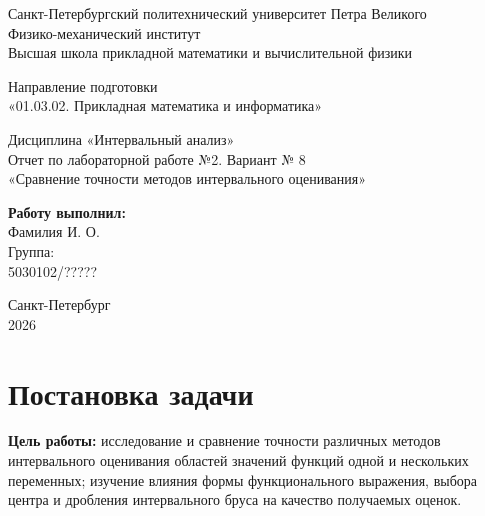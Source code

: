 \documentclass[12pt,a4paper]{article}
\begin{document}
\begin{titlepage}
\begin{center}
Санкт-Петербургский политехнический университет Петра Великого\\
Физико-механический институт\\
Высшая школа прикладной математики и вычислительной физики

\vspace{4cm}

Направление подготовки\\
«01.03.02. Прикладная математика и информатика»

\vspace{3cm}

{\LARGE Дисциплина «Интервальный анализ»}\\[0.5cm]
{\large Отчет по лабораторной работе №2. Вариант № 8}\\[0.3cm]
{\large «Сравнение точности методов интервального оценивания»}
\end{center}

\vspace{3cm}

\begin{flushright}
\begin{minipage}{0.35\textwidth}
\textbf{Работу выполнил:}\\
Фамилия И. О.\\
Группа:\\
5030102/?????
\end{minipage}
\end{flushright}

\vfill
\begin{center}
Санкт-Петербург\\
2026
\end{center}
\end{titlepage}

\tableofcontents
\newpage

\section{Постановка задачи}

\textbf{Цель работы:} исследование и сравнение точности различных методов интервального оценивания областей значений функций одной и нескольких переменных; изучение влияния формы функционального выражения, выбора центра и дробления интервального бруса на качество получаемых оценок.
\end{document}
